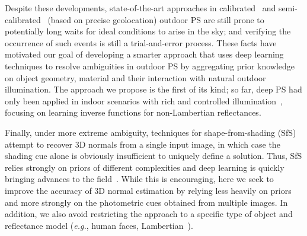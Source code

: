 Despite these developments, state-of-the-art approaches in calibrated~\cite{yu-iccp-13} and semi-calibrated~\cite{jung-cvpr-15} (based on precise geolocation) outdoor PS are still prone to potentially long waits for ideal conditions to arise in the sky; and verifying the occurrence of such events is still a trial-and-error process. These facts have motivated our goal of developing a smarter approach that uses deep learning techniques to resolve ambiguities in outdoor PS by aggregating prior knowledge on object geometry, material and their interaction with natural outdoor illumination. The approach we propose is the first of its kind; so far, deep PS had only been applied in indoor scenarios with rich and controlled illumination~\cite{yu-iccv-17,santo-iccv-17,taniai-arxiv-18,shi-tpami-18}, focusing on learning inverse functions for non-Lambertian reflectances.



Finally, under more extreme ambiguity, techniques for shape-from-shading (SfS)~\cite{oxholm-eccv-12,johnson-cvpr-11,barron-pami-15} attempt to recover 3D normals from a single input image, in which case the shading cue alone is obviously insufficient to uniquely define a solution. Thus, SfS relies strongly on priors of different complexities and deep learning is quickly bringing advances to the field~\cite{eigen-iccv-15,shu-cvpr-17,wu-nips-17}. While this is encouraging, here we seek to improve the accuracy of 3D normal estimation by relying less heavily on priors and more strongly on the photometric cues obtained from multiple images. In addition, we also avoid restricting the approach to a specific type of object and reflectance model ({\em e.g.}, human faces, Lambertian~\cite{shu-cvpr-17}).

%


